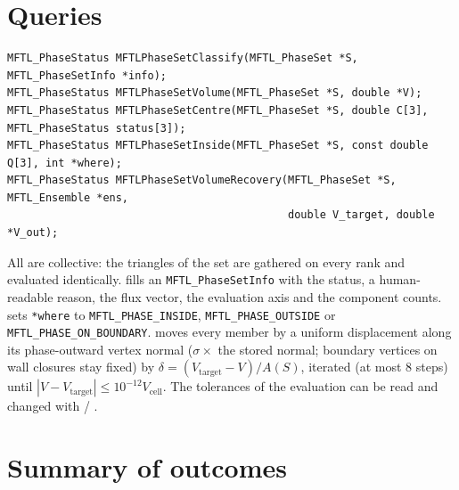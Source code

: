 \section{Queries}

\begin{lstlisting}[numbers=none]
MFTL_PhaseStatus MFTLPhaseSetClassify(MFTL_PhaseSet *S, MFTL_PhaseSetInfo *info);
MFTL_PhaseStatus MFTLPhaseSetVolume(MFTL_PhaseSet *S, double *V);
MFTL_PhaseStatus MFTLPhaseSetCentre(MFTL_PhaseSet *S, double C[3], MFTL_PhaseStatus status[3]);
MFTL_PhaseStatus MFTLPhaseSetInside(MFTL_PhaseSet *S, const double Q[3], int *where);
MFTL_PhaseStatus MFTLPhaseSetVolumeRecovery(MFTL_PhaseSet *S, MFTL_Ensemble *ens,
                                            double V_target, double *V_out);
\end{lstlisting}
All are collective: the triangles of the set are gathered on every rank and evaluated
identically.  fills an \texttt{MFTL\_PhaseSetInfo} with the status, a
human-readable reason, the flux vector, the evaluation axis and the component counts.
 sets \texttt{*where} to \texttt{MFTL\_PHASE\_INSIDE},
\texttt{MFTL\_PHASE\_OUTSIDE} or \texttt{MFTL\_PHASE\_ON\_BOUNDARY}. 
moves every member by a uniform displacement along its phase-outward vertex normal
($\sigma\times$ the stored normal; boundary vertices on wall closures stay fixed) by
$\delta=(V_{\text{target}}-V)/A(S)$, iterated (at most 8 steps) until
$|V-V_{\text{target}}|\le10^{-12}V_{\text{cell}}$. The tolerances of the evaluation can be read and
changed with  / .

\section{Summary of outcomes}

